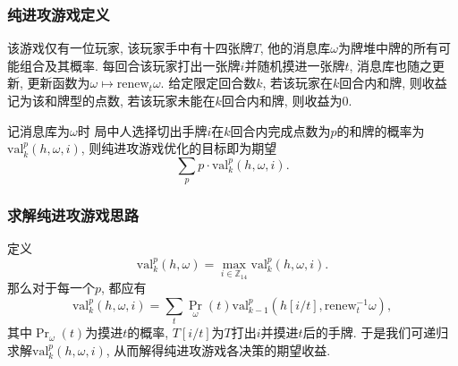 \documentclass[xcolor=dvipsnames]{ctexbeamer}
\newcommand{\hand}{h}
\newcommand{\base}{\omega}
\begin{document}
    \begin{frame}
        \frametitle{纯进攻游戏定义}
        \begin{definition}[纯进攻游戏]
            该游戏仅有一位玩家, 该玩家手中有十四张牌$T$,
            他的消息库$\base$为牌堆中牌的所有可能组合及其概率.
            每回合该玩家打出一张牌$i$并随机摸进一张牌$t$, 消息库也随之更新,
            更新函数为$\base\mapsto\mathrm{renew}_t{\base}$.
            给定限定回合数$k$,
            若该玩家在$k$回合内和牌, 则收益记为该和牌型的点数,
            若该玩家未能在$k$回合内和牌, 则收益为0.
        \end{definition}
        记消息库为$\base$时
        局中人选择切出手牌$i$在$k$回合内完成点数为$p$的和牌的概率为
        $\mathrm{val}_{k}^{p}(\hand, \base, i)$,
        则纯进攻游戏优化的目标即为期望
        \[\sum_{p}{p\cdot\mathrm{val}_{k}^{p}(\hand, \base, i)}.\]
    \end{frame}

    \begin{frame}
        \frametitle{求解纯进攻游戏思路}
        定义
        \[\mathrm{val}_{k}^{p}(\hand, \base)=
        \max_{i\in\mathbb{Z}_{14}}{\mathrm{val}_{k}^{p}(\hand, \base, i)}.\]
        那么对于每一个$p$, 都应有
        \[\mathrm{val}_{k}^{p}(\hand, \base, i)=
        \sum_{t}{\Pr_{\base}}(t)\mathrm{val}_{k-1}^{p}(\hand[i/t],
        \mathrm{renew}_{t}^{-1}{\base}),\]
        其中$\Pr_{\base}(t)$为摸进$t$的概率,
        $T[i/t]$为$T$打出$i$并摸进$t$后的手牌.
        于是我们可递归求解$\mathrm{val}_{k}^{p}(\hand, \base, i)$,
        从而解得纯进攻游戏各决策的期望收益.
    \end{frame}
\end{document}
